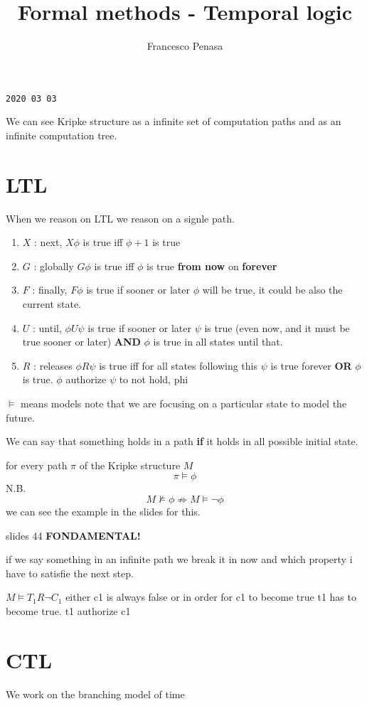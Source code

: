 \documentclass[11pt]{article}
\begin{document}
\author{Francesco Penasa}
\title{Formal methods - Temporal logic}
\maketitle

\medskip

\texttt{2020 03 03}

We can see Kripke structure as a infinite set of computation paths and as an infinite computation tree.

\section{LTL} %
\label{sec:ltl}
When we reason on LTL we reason on a signle path.

\begin{enumerate}
	\item $X$ : next, $X\phi$ is true iff $\phi+1$ is true
	
	\item $G$ : globally $G\phi$ is true iff $\phi$ is true \textbf{from now} on \textbf{forever}
	
	\item $F$ : finally, $F\phi$ is true if sooner or later $\phi$ will be true, it could be also the current state.

	\item $U$ : until, $\phi U \psi$ is true if sooner or later $\psi$ is true (even now, and it must be true sooner or later) \textbf{AND} $\phi$ is true in all states until that.

	\item $R$ : releases $\phi R \psi$ is true iff for all states following this $\psi$ is true forever \textbf{OR} $\phi$ is true. $\phi$ authorize $\psi$ to not hold, phi 
\end{enumerate}

$\models$ means models
note that we are focusing on a particular state to model the future.

We can say that something holds in a path \textbf{if} it holds in all possible initial state.

for every path $\pi$ of the Kripke structure $M$
\[
	\pi \models \phi
\] 
N.B.
\[
	M \not\models \phi \not\Rightarrow M \models \lnot \phi
\]
we can see the example in the slides for this.

slides 44 \textbf{FONDAMENTAL!}

if we say something in an infinite path we break it in now and which property i have to satisfie the next step.

$M \models T_1 R \lnot C_1$
either c1 is always false or in order for c1 to become true t1 has to become true.
t1 authorize c1


\section{CTL} %
\label{sec:ctl}
We work on the branching model of time
\end{document}

